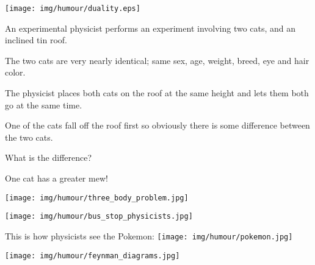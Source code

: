 	\begin{center}\underline{\hspace{5 cm}}\end{center}

	\begin{center}
	\texttt{[image: img/humour/duality.eps]}
	\end{center}
	
	\begin{center}\underline{\hspace{5 cm}}\end{center}
	An experimental physicist performs an experiment involving two cats, and an inclined tin roof.
	
	The two cats are very nearly identical; same sex, age, weight, breed, eye and hair color.
	
	The physicist places both cats on the roof at the same height and lets them both go at the same time.
	
	One of the cats fall off the roof first so obviously there is some difference between the two cats.
	
	What is the difference?
	
	One cat has a greater mew!
	
	\begin{center}\underline{\hspace{5 cm}}\end{center}
	
	\begin{center}
	\texttt{[image: img/humour/three\_body\_problem.jpg]}
	\end{center}
	
	\begin{center}\underline{\hspace{5 cm}}\end{center}
	
	\begin{center}
	\texttt{[image: img/humour/bus\_stop\_physicists.jpg]}
	\end{center}
	
	\begin{center}\underline{\hspace{5 cm}}\end{center}
	
	\begin{center}
		This is how physicists see the Pokemon:
		\texttt{[image: img/humour/pokemon.jpg]}
	\end{center}
	
	\begin{center}
	\texttt{[image: img/humour/feynman\_diagrams.jpg]}
	\end{center}
	
